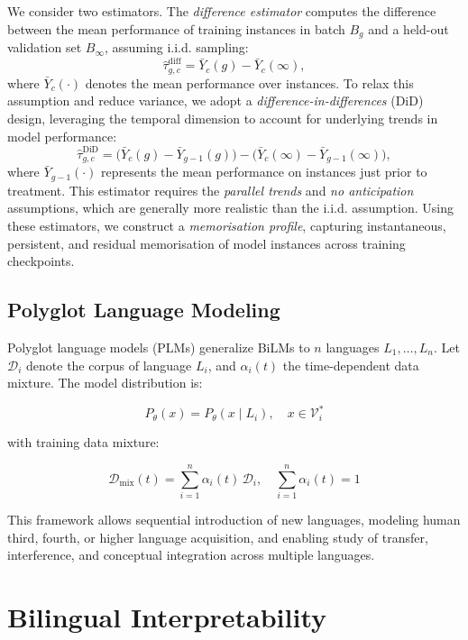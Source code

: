 We consider two estimators. The \emph{difference estimator} computes the difference between the mean performance of training instances in batch $B_g$ and a held-out validation set $B_\infty$, assuming i.i.d. sampling:
\begin{equation}
\hat{\tau}^{\text{diff}}_{g,c} = \bar{Y}_c(g) - \bar{Y}_c(\infty),
\end{equation}
where $\bar{Y}_c(\cdot)$ denotes the mean performance over instances. To relax this assumption and reduce variance, we adopt a \emph{difference-in-differences} (DiD) design, leveraging the temporal dimension to account for underlying trends in model performance:
\begin{equation}
\hat{\tau}^{\text{DiD}}_{g,c} = \big(\bar{Y}_c(g) - \bar{Y}_{g-1}(g)\big) - \big(\bar{Y}_c(\infty) - \bar{Y}_{g-1}(\infty)\big),
\end{equation}
where $\bar{Y}_{g-1}(\cdot)$ represents the mean performance on instances just prior to treatment. This estimator requires the \emph{parallel trends} and \emph{no anticipation} assumptions, which are generally more realistic than the i.i.d. assumption. Using these estimators, we construct a \emph{memorisation profile}, capturing instantaneous, persistent, and residual memorisation of model instances across training checkpoints.



\subsection{Polyglot Language Modeling}

Polyglot language models (PLMs) generalize BiLMs to $n$ languages $L_1,\dots,L_n$. Let $\mathcal{D}_i$ denote the corpus of language $L_i$, and $\alpha_i(t)$ the time-dependent data mixture. The model distribution is:

\[
P_\theta(x) = P_\theta(x \mid L_i), \quad x \in \mathcal{V}_i^*
\]

with training data mixture:

\[
\mathcal{D}_\text{mix}(t) = \sum_{i=1}^n \alpha_i(t) \, \mathcal{D}_i, \quad \sum_{i=1}^n \alpha_i(t) = 1
\]

This framework allows sequential introduction of new languages, modeling human third, fourth, or higher language acquisition, and enabling study of transfer, interference, and conceptual integration across multiple languages.




\section{Bilingual Interpretability}






